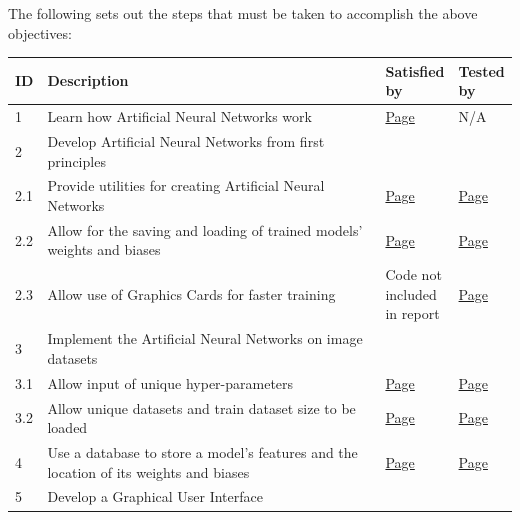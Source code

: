 \documentclass[./project-report/src/latex/project-report.tex]{subfiles}
\begin{document}
The following sets out the steps that must be taken to accomplish the above objectives:

\noindent\begin{tabular}{|p{0.03\linewidth}|p{0.73\linewidth}|p{0.12\linewidth}|p{0.12\linewidth}|}
      \hline
      \textbf{ID} & \textbf{Description} & \textbf{Satisfied by} & \textbf{Tested by} \\
      \hline
      1 & Learn how Artificial Neural Networks work & \hyperref[sec:ann-theory]{Page \pageref{sec:ann-theory}} & N/A \\
      \hline
      2 & Develop Artificial Neural Networks from first principles & & \\
      \hline
      2.1 & Provide utilities for creating Artificial Neural Networks & \hyperref[sec:utils-subpackage]{Page \pageref{sec:utils-subpackage}} & \hyperref[sec:models-utils-unit-tests]{Page \pageref{sec:models-utils-unit-tests}} \\
      \hline
      2.2 & Allow for the saving and loading of trained models' weights and biases & \hyperref[sec:model-module]{Page \pageref{sec:model-module}} & \hyperref[sec:models-utils-unit-tests]{Page \pageref{sec:models-utils-unit-tests}} \\
      \hline
      2.3 & Allow use of Graphics Cards for faster training & Code not included in report & \hyperref[sec:cpu-vs-gpu-analysis]{Page \pageref{sec:cpu-vs-gpu-analysis}} \\
      \hline
      3 & Implement the Artificial Neural Networks on image datasets & & \\
      \hline
      3.1 & Allow input of unique hyper-parameters & \hyperref[sec:ann-implementations]{Page \pageref{sec:ann-implementations}} & \hyperref[sec:effects-of-hyper-parameters]{Page \pageref{sec:effects-of-hyper-parameters}} \\
      \hline
      3.2 & Allow unique datasets and train dataset size to be loaded & \hyperref[sec:ann-implementations]{Page \pageref{sec:ann-implementations}} & \hyperref[sec:train-dataset-size-analysis]{Page \pageref{sec:train-dataset-size-analysis}} \\
      \hline
      4 & Use a database to store a model's features and the location of its weights and biases & \hyperref[sec:__main__-module]{Page \pageref{sec:__main__-module}} & \hyperref[sec:database-unit-tests]{Page \pageref{sec:database-unit-tests}} \\
      \hline
      5 & Develop a Graphical User Interface & & \\

\end{tabular}
\end{document}
